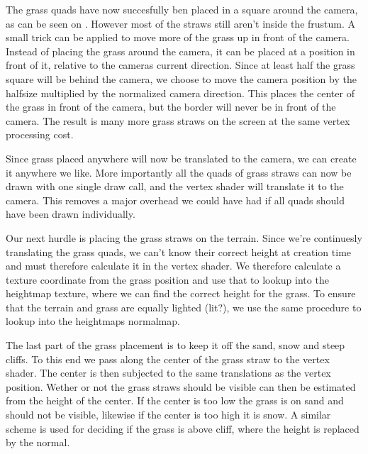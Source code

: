

The grass quads have now succesfully ben placed in a square around the
camera, as can be seen on . However most
of the straws still aren't inside the frustum. A small trick can be
applied to move more of the grass up in front of the camera. Instead
of placing the grass around the camera, it can be placed at a position
in front of it, relative to the cameras current direction. Since at
least half the grass square will be behind the camera, we choose to
move the camera position by the halfsize multiplied by the normalized
camera direction. This places the center of the grass in front of the
camera, but the border will never be in front of the camera. The
result is many more grass straws on the screen at the same vertex
processing cost.


Since grass placed anywhere will now be translated to the camera, we
can create it anywhere we like. More importantly all the quads of
grass straws can now be drawn with one single draw call, and the
vertex shader will translate it to the camera. This removes a major
overhead we could have had if all quads should have been drawn
individually.


Our next hurdle is placing the grass straws on the terrain. Since
we're continuesly translating the grass quads, we can't know their
correct height at creation time and must therefore calculate it in the
vertex shader. We therefore calculate a texture coordinate from the
grass position and use that to lookup into the heightmap texture,
where we can find the correct height for the grass. To ensure that the
terrain and grass are equally lighted (lit?), we use the same
procedure to lookup into the heightmaps normalmap.


The last part of the grass placement is to keep it off the sand, snow
and steep cliffs. To this end we pass along the center of the grass
straw to the vertex shader. The center is then subjected to the same
translations as the vertex position. Wether or not the grass straws
should be visible can then be estimated from the height of the
center. If the center is too low the grass is on sand and should not
be visible, likewise if the center is too high it is snow. A similar
scheme is used for deciding if the grass is above cliff, where the
height is replaced by the normal.

